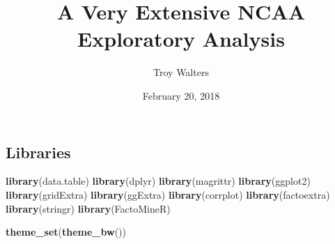 \documentclass[]{article}
\title{A Very Extensive NCAA Exploratory Analysis}
\author{Troy Walters}
\date{February 20, 2018}
\newenvironment{Shaded}{\begin{snugshade}}{\end{snugshade}}
\newcommand{\KeywordTok}[1]{\textcolor[rgb]{0.13,0.29,0.53}{\textbf{#1}}}
\newcommand{\NormalTok}[1]{#1}
\begin{document}
\maketitle

\subsection{Libraries}\label{libraries}

\begin{Shaded}
\begin{Highlighting}[]
\KeywordTok{library}\NormalTok{(data.table)}
\KeywordTok{library}\NormalTok{(dplyr)}
\KeywordTok{library}\NormalTok{(magrittr)}
\KeywordTok{library}\NormalTok{(ggplot2)}
\KeywordTok{library}\NormalTok{(gridExtra)}
\KeywordTok{library}\NormalTok{(ggExtra)}
\KeywordTok{library}\NormalTok{(corrplot)}
\KeywordTok{library}\NormalTok{(factoextra)}
\KeywordTok{library}\NormalTok{(stringr)}
\KeywordTok{library}\NormalTok{(FactoMineR)}

\KeywordTok{theme_set}\NormalTok{(}\KeywordTok{theme_bw}\NormalTok{())}
\end{Highlighting}
\end{Shaded}
\end{document}
